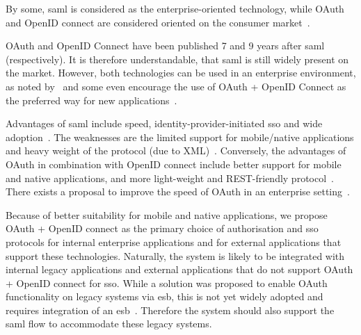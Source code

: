By some, \acrshort{saml} is considered as the enterprise-oriented technology, while OAuth and OpenID connect are considered oriented on the consumer market~\cite{Fagbemi2016ComparingWS-Federation, SoftwareSecured2016Differentiating2, OneLoginInc.SAMLOAuth}.

OAuth and OpenID Connect have been published 7 and 9 years after \acrshort{saml} (respectively). It is therefore understandable, that \acrshort{saml} is still widely present on the market. However, both technologies can be used in an enterprise environment, as noted by~\cite{Naik2017SecuringConnect} and some even encourage the use of OAuth + OpenID Connect as the preferred way for new applications~\cite{barbkess2019SingleDirectory}.

Advantages of \acrshort{saml} include speed, identity-provider-initiated \acrshort{sso} and wide adoption~\cite{OneLoginInc.SAMLOAuth, Naik2017SecuringConnect}. The weaknesses are the limited support for mobile/native applications and heavy weight of the protocol (due to XML)~\cite{Naik2017SecuringConnect}. Conversely, the advantages of OAuth in combination with OpenID connect include better support for mobile and native applications, and more light-weight and REST-friendly protocol~\cite{Naik2017SecuringConnect}. There exists a proposal to improve the speed of OAuth in an enterprise setting~\cite{Noureddine2011AEnterprise}.

Because of better suitability for mobile and native applications, we propose OAuth + OpenID connect as the primary choice of authorisation and \acrshort{sso} protocols for internal enterprise applications and for external applications that support these technologies. Naturally, the system is likely to be integrated with internal legacy applications and external applications that do not support OAuth + OpenID connect for \acrshort{sso}. While a solution was proposed to enable OAuth functionality on legacy systems via \acrfull{esb}, this is not yet widely adopted and requires integration of an \acrshort{esb}~\cite{deSousaRibeiro2018AnBus}. Therefore the system should also support the \acrshort{saml} flow to accommodate these legacy systems.




